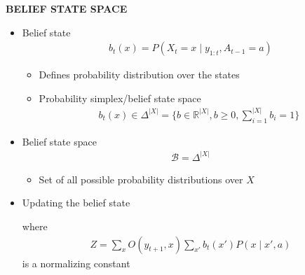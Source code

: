 \begin{whitebox}{\textbf{BELIEF STATE SPACE}}
    \begin{itemize}
        \item Belief state
        \begin{align*}
            b_t(x)=P(X_t=x\mid y_{1:t},A_{t-1}=a)
        \end{align*}
        \begin{itemize}
            \item Defines probability distribution over the states
            \item Probability simplex/belief state space
            \begin{align*}
                b_t(x)\in\Delta^{|X|}=\{b\in\mathbb{R}^{|X|},b\geq0,\sum_{i=1}^{|X|}b_i=1\}
            \end{align*}
        \end{itemize}
        \item Belief state space
        \begin{align*}
            \mathcal{B}=\Delta^{|X|}
        \end{align*}
        \begin{itemize}
            \item Set of all possible probability distributions over $X$
        \end{itemize}
        \item Updating the belief state
        \begin{center}
        \end{center}
        where 
        \begin{align*}
            Z=\sum_xO(y_{t+1},x)\sum_{x'}b_t(x')P(x\mid x',a)
        \end{align*}
        is a normalizing constant
    \end{itemize}
\end{whitebox}

